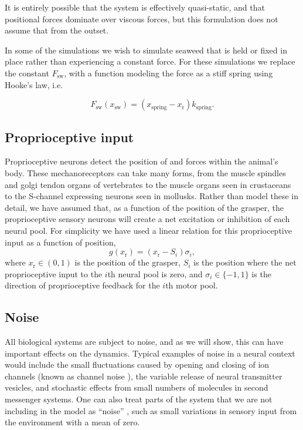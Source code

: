It is entirely possible that the system is effectively quasi-static, and that
positional forces dominate over viscous forces, but this formulation does not
assume that from the outset.

In some of the simulations we wish to simulate seaweed that is held or fixed
in place rather than experiencing a constant force.  For these simulations we
replace the constant $F_\textrm{sw}$, with a function modeling the force as a
stiff spring using Hooke's law, i.e.

\begin{equation}
    \label{eq:spring}
    F_{\textrm{sw}}(x_\textrm{sw}) = (x_{\textrm{spring}} - x_\textrm{r}) k_{\textrm{spring}}.
\end{equation}
\subsection{Proprioceptive input}
\label{methods_proprioception}

Proprioceptive neurons detect the position of and forces within the animal's
body.  These mechanoreceptors can take many forms, from the muscle spindles and
golgi tendon organs of vertebrates to the muscle organs seen in crustaceans to
the S-channel expressing neurons seen in mollusks\citep{vandorpe_fmrfamide_1994}.
Rather than model these in detail, we have
assumed that, as a function of the position of the grasper, the proprioceptive
sensory neurons will create a net excitation or inhibition of each neural pool.
For simplicity we have used a linear relation for this proprioceptive
input as a function of position,
\begin{equation}
    g(x_\textrm{r}) = (x_\textrm{r} - S_i) \sigma_i,
\end{equation}
where $x_\textrm{r} \in (0,1)$ is the position of the grasper, $S_i$ is the position where the net
proprioceptive input to the $i$th neural pool is zero, and $\sigma_i \in \{-1,1\}$ is the
direction of proprioceptive feedback for the $i$th motor pool.


\subsection{Noise}
\label{methods_noise}

All biological systems are subject to noise, and as we will show, this can have
important effects on the dynamics.  Typical examples of noise in a neural
context would include the small fluctuations caused by opening and closing of
ion channels (known as channel noise
\citep{White+Kay+Rubinstein:2000:TrendsNsci,
GoldwynSheaBrown2011PLoSComputBiol}), the variable release of neural transmitter
vesicles, and stochastic effects from small numbers
of molecules in second messenger systems.
One can also treat parts of the system that we are not including in the model
as ``noise'' \citep{schiff_neural_2012}, such as small variations in sensory
input from the environment with a mean of zero.

